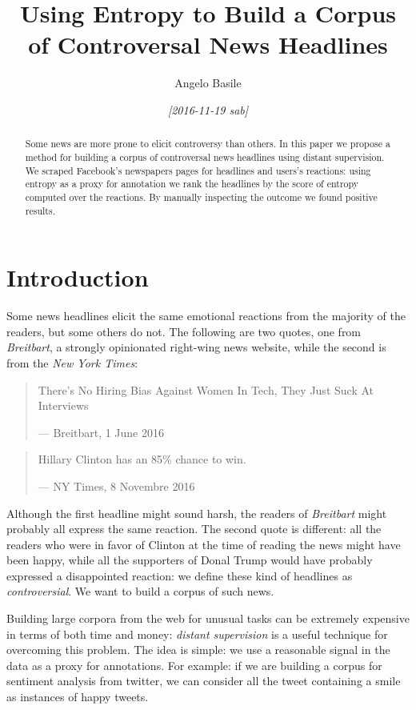 \documentclass[article,11pt,nofixltx2e]{article}
\author{Angelo Basile}
\date{\textit{[2016-11-19 sab]}}
\title{Using Entropy to Build a Corpus of Controversal News Headlines}
\begin{document}
\maketitle
\begin{abstract}
Some news are more prone to elicit controversy than others. In this paper we propose a method for building a corpus of controversal news headlines using distant supervision. We scraped Facebook's newspapers pages for headlines and users's reactions: using entropy as a proxy for annotation we rank the headlines by the score of entropy computed over the reactions. By manually inspecting the outcome we found positive results.
\end{abstract}

\section{Introduction}
\label{sec-1}

Some news headlines elicit the same emotional reactions from the majority of the readers, but some others do not. The following are two quotes, one from \emph{Breitbart}, a strongly opinionated right-wing news website, while the second is from the \emph{New York Times}:

\begin{quote}
There’s No Hiring Bias Against Women In Tech, They Just Suck At Interviews

--- Breitbart, 1 June 2016
\end{quote}

\begin{quote}
Hillary Clinton has an 85\% chance to win.

--- NY Times, 8 Novembre 2016
\end{quote}

Although the first headline might sound harsh, the readers of \emph{Breitbart} might probably all express the same reaction. The second quote is different: all the readers who were in favor of Clinton at the time of reading the news might have been happy, while all the supporters of Donal Trump would have probably expressed a disappointed reaction: we define these kind of headlines as \emph{controversial}. We want to build a corpus of such news.

Building large corpora from the web for unusual tasks can be extremely expensive in terms of both time and money: \emph{distant supervision} is a useful technique for overcoming this problem. The idea is simple: we use a reasonable signal in the data as a proxy for annotations. For example: if we are building a corpus for sentiment analysis from twitter, we can consider all the tweet containing a smile as instances of happy tweets.
\end{document}
